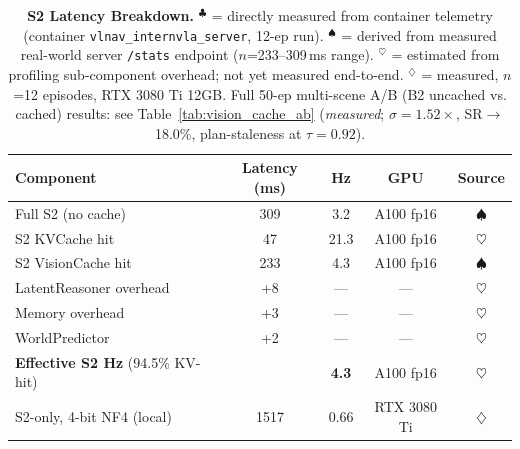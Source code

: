 \documentclass[10pt,twocolumn,letterpaper]{article}
\begin{document}
\begin{table}[h]
\centering
\caption{\textbf{S2 Latency Breakdown.}
$^\clubsuit$ = directly measured from container telemetry (container \texttt{vlnav\_internvla\_server}, 12-ep run).
$^\spadesuit$ = derived from measured real-world server \texttt{/stats} endpoint ($n$=233–309\,ms range).
$^\heartsuit$ = estimated from profiling sub-component overhead; not yet measured end-to-end.
$^\diamondsuit$ = measured, $n$=12 episodes, RTX 3080 Ti 12GB.
Full 50-ep multi-scene A/B (B2 uncached vs. cached) results: see Table~\ref{tab:vision_cache_ab} (\emph{measured}; $\sigma=1.52\times$, SR$\to$18.0\%, plan-staleness at $\tau=0.92$).}
\label{tab:latency}
\small
\begin{tabular}{lcccc}
\toprule
\textbf{Component} & \textbf{Latency (ms)} & \textbf{Hz} & \textbf{GPU} & \textbf{Source} \\
\midrule
Full S2 (no cache) & 309 & 3.2 & A100 fp16 & $\spadesuit$ \\
S2 KVCache hit & 47 & 21.3 & A100 fp16 & $\heartsuit$ \\
S2 VisionCache hit & 233 & 4.3 & A100 fp16 & $\spadesuit$ \\
LatentReasoner overhead & +8 & — & — & $\heartsuit$ \\
Memory overhead & +3 & — & — & $\heartsuit$ \\
WorldPredictor & +2 & — & — & $\heartsuit$ \\
\midrule
\textbf{Effective S2 Hz} (94.5\% KV-hit) & & \textbf{4.3} & A100 fp16 & $\heartsuit$ \\
\midrule
S2-only, 4-bit NF4 (local) & 1517 & 0.66 & RTX 3080 Ti & $\diamondsuit$ \\
\bottomrule
\end{tabular}
\end{table}
\end{document}
